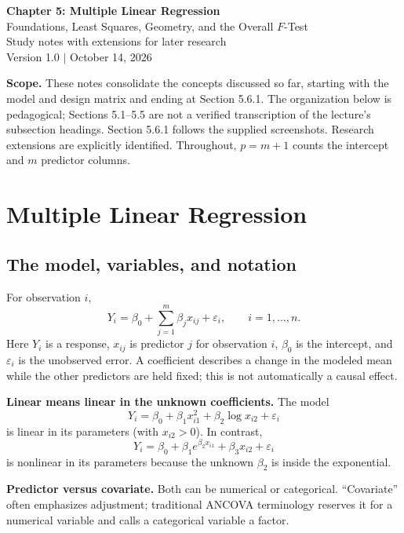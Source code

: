 \documentclass[11pt]{article}
\begin{document}
\begin{center}
{\LARGE\bfseries Chapter 5: Multiple Linear Regression}\\[5pt]
{\large Foundations, Least Squares, Geometry, and the Overall $F$-Test}\\[5pt]
Study notes with extensions for later research\\
Version 1.0 $\mid$ October 14, 2026
\end{center}
\textbf{Scope.} These notes consolidate the concepts discussed so far, starting with the model and design matrix and ending at Section 5.6.1. The organization below is pedagogical; Sections 5.1--5.5 are not a verified transcription of the lecture's subsection headings. Section 5.6.1 follows the supplied screenshots. Research extensions are explicitly identified. Throughout, $p=m+1$ counts the intercept and $m$ predictor columns.
\tableofcontents
\newpage
\setcounter{section}{4}
\section{Multiple Linear Regression}
\subsection{The model, variables, and notation}
For observation $i$,
\[
Y_i=\beta_0+\sum_{j=1}^m\beta_jx_{ij}+\varepsilon_i,
\qquad i=1,\ldots,n.
\]
Here $Y_i$ is a response, $x_{ij}$ is predictor $j$ for observation $i$, $\beta_0$ is the intercept, and $\varepsilon_i$ is the unobserved error. A coefficient describes a change in the modeled mean while the other predictors are held fixed; this is not automatically a causal effect.

\textbf{Linear means linear in the unknown coefficients.} The model
\[
Y_i=\beta_0+\beta_1x_{i1}^2+\beta_2\log x_{i2}+\varepsilon_i
\]
is linear in its parameters (with $x_{i2}>0$). In contrast,
\[
Y_i=\beta_0+\beta_1e^{\beta_2x_{i1}}+\beta_3x_{i2}+\varepsilon_i
\]
is nonlinear in its parameters because the unknown $\beta_2$ is inside the exponential.

\textbf{Predictor versus covariate.} Both can be numerical or categorical. ``Covariate'' often emphasizes adjustment; traditional ANCOVA terminology reserves it for a numerical variable and calls a categorical variable a factor.
\end{document}
